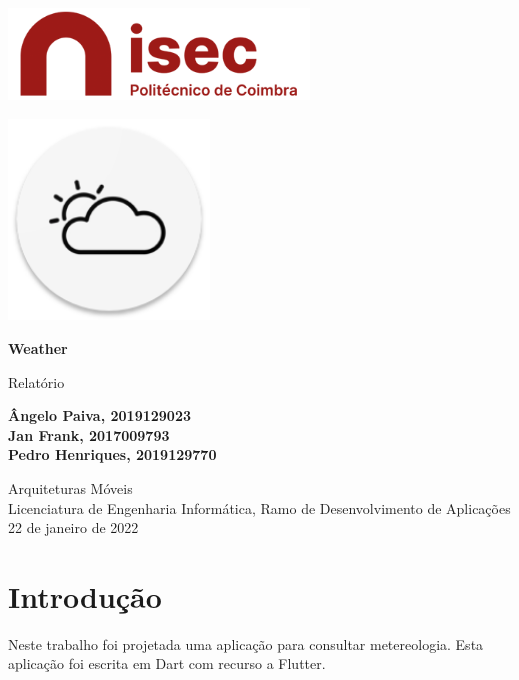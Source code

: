 \documentclass[11pt]{article}
\begin{document}
	\begin{titlepage}
		\begin{center}
			\includegraphics[width=0.6\textwidth]{logo-isec}
			
			\vspace*{\fill}
			
			\includegraphics[width=0.4\textwidth]{icon-weather}
			
			\Huge
			\textbf{Weather}
			
			\huge
			Relatório
			
			\vspace{2cm}
			
			\Large
			\textbf{
				Ângelo Paiva, 2019129023 \\
				Jan Frank, 2017009793 \\
				Pedro Henriques, 2019129770
			}
			
			\vfill
			\vspace*{\fill}
			
			\normalsize
			Arquiteturas Móveis \\
			Licenciatura de Engenharia Informática, Ramo de Desenvolvimento de Aplicações \\
			22 de janeiro de 2022		
		\end{center}
	\end{titlepage}

	\tableofcontents
	\pagebreak
	
	\large
	\section{Introdução}
	\normalsize
	
	Neste trabalho foi projetada uma aplicação para consultar metereologia. Esta aplicação foi escrita em Dart com recurso a Flutter.
	
\end{document}
